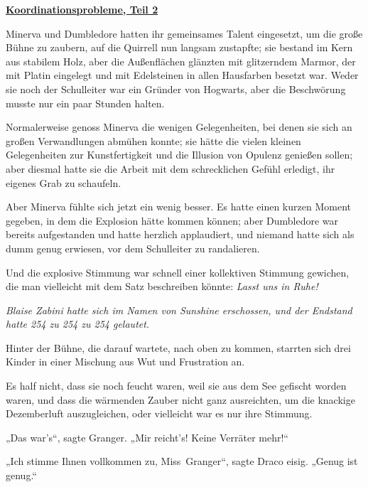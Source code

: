 

\hypertarget{koordinationsprobleme-teil-2}{%

\textbf{\uline{Koordinationsprobleme, Teil 2}}

Minerva und Dumbledore hatten ihr gemeinsames Talent eingesetzt, um die große Bühne zu zaubern, auf die Quirrell nun langsam zustapfte; sie bestand im Kern aus stabilem Holz, aber die Außenflächen glänzten mit glitzerndem Marmor, der mit Platin eingelegt und mit Edelsteinen in allen Hausfarben besetzt war. Weder sie noch der Schulleiter war ein Gründer von Hogwarts, aber die Beschwörung musste nur ein paar Stunden halten.

Normalerweise genoss Minerva die wenigen Gelegenheiten, bei denen sie sich an großen Verwandlungen abmühen konnte; sie hätte die vielen kleinen Gelegenheiten zur Kunstfertigkeit und die Illusion von Opulenz genießen sollen; aber diesmal hatte sie die Arbeit mit dem schrecklichen Gefühl erledigt, ihr eigenes Grab zu schaufeln.

Aber Minerva fühlte sich jetzt ein wenig besser. Es hatte einen kurzen Moment gegeben, in dem die Explosion hätte kommen können; aber Dumbledore war bereits aufgestanden und hatte herzlich applaudiert, und niemand hatte sich als dumm genug erwiesen, vor dem Schulleiter zu randalieren.

Und die explosive Stimmung war schnell einer kollektiven Stimmung gewichen, die man vielleicht mit dem Satz beschreiben könnte: \emph{Lasst uns in Ruhe!}

\emph{Blaise Zabini hatte sich im Namen von Sunshine erschossen, und der Endstand hatte 254 zu 254 zu 254 gelautet.}

Hinter der Bühne, die darauf wartete, nach oben zu kommen, starrten sich drei Kinder in einer Mischung aus Wut und Frustration an.

Es half nicht, dass sie noch feucht waren, weil sie aus dem See gefischt worden waren, und dass die wärmenden Zauber nicht ganz ausreichten, um die knackige Dezemberluft auszugleichen, oder vielleicht war es nur ihre Stimmung.

„Das war's“, sagte Granger. „Mir reicht's! Keine Verräter mehr!“

„Ich stimme Ihnen vollkommen zu, Miss~Granger“, sagte Draco eisig. „Genug ist genug.“

}

